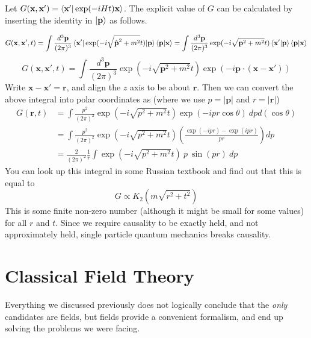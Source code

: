 \documentclass[11pt]{article}
\numberwithin{equation}{section}
\begin{document}
    Let \(G(\textbf{x},\textbf{x}') = \braket{\textbf{x}' | \exp(-iHt) \textbf{x}}\). The explicit value of \(G\) can be calculated by inserting the identity in \(\ket{\textbf{p}}\) as follows.

    \begin{equation}
        G(\textbf{x}, \textbf{x}', t) = \int \frac{d^3\textbf{p}}{(2\pi)^3} \braket{\textbf{x}' | \exp(-i\sqrt{\hat{\textbf{p}}^2 + m^2} t) | \textbf{p}} \braket{\textbf{p}|\textbf{x}} = \int \frac{d^3\textbf{p}}{(2\pi)^3} \exp(-i\sqrt{\textbf{p}^2 + m^2} t)\braket{\textbf{x}'| \textbf{p}} \braket{\textbf{p}|\textbf{x}}
    \end{equation}
    \begin{equation}
        G(\textbf{x},\textbf{x}', t) = \int \frac{d^3\textbf{p}}{(2\pi)^3}  \exp(-i\sqrt{\textbf{p}^2 + m^2} t) \exp(-i \textbf{p}\cdot(\textbf{x}-\textbf{x}'))
    \end{equation}
    Write \(\textbf{x} - \textbf{x}' = \textbf{r}\), and align the \(z\) axis to be about \(\textbf{r}\). Then we can convert the above integral into polar coordinates as (where we use \(p = |\textbf{p}|\) and \(r = |\textbf{r}|\))
    \begin{align}
        G(\textbf{r}, t) &= \int \frac{p^2}{(2\pi)^2} \exp(-i\sqrt{p^2 + m^2} t) \exp(-i p r \cos\theta)~ dp d(\cos\theta)\\
        &= \int \frac{p^2}{(2\pi)^2} \exp(-i\sqrt{p^2 + m^2} t) \left( \frac{\exp(-ipr) - \exp(ipr)}{pr} \right)dp\\
        &= \frac{2}{(2\pi)^2}\frac{1}{r}\int \exp(-i\sqrt{p^2 + m^2} t)~ p ~\sin(pr)~dp
    \end{align}
    You can look up this integral in some Russian textbook and find out that this is equal to 
    \begin{equation}
        G \propto K_2 (m\sqrt{r^2 + t^2}) 
    \end{equation}
    This is some finite non-zero number (although it might be small for some values) for all \(r\) and \(t\). Since we require causality to be exactly held, and not approximately held, single particle quantum mechanics breaks causality.

    \newpage
    \section{Classical Field Theory}
    Everything we discussed previously does not logically conclude that the \textit{only} candidates are fields, but fields provide a convenient formalism, and end up solving the problems we were facing. \\
\end{document}
